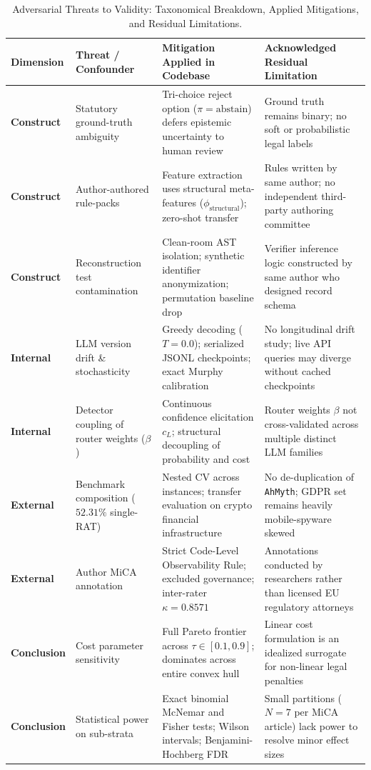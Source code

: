 \begin{table}[t]
\centering
\small
\caption{Adversarial Threats to Validity: Taxonomical Breakdown, Applied Mitigations, and Residual Limitations.}
\label{tab:threats_summary}
\begin{tabular}{p{2.2cm}p{3.8cm}p{5.0cm}p{4.8cm}}
\toprule
\textbf{Dimension} & \textbf{Threat / Confounder} & \textbf{Mitigation Applied in Codebase} & \textbf{Acknowledged Residual Limitation} \\
\midrule
\textbf{Construct} & Statutory ground-truth ambiguity & Tri-choice reject option ($\pi = \text{abstain}$) defers epistemic uncertainty to human review & Ground truth remains binary; no soft or probabilistic legal labels \\
\addlinespace
\textbf{Construct} & Author-authored rule-packs & Feature extraction uses structural meta-features ($\phi_{\text{structural}}$); zero-shot transfer & Rules written by same author; no independent third-party authoring committee \\
\addlinespace
\textbf{Construct} & Reconstruction test contamination & Clean-room AST isolation; synthetic identifier anonymization; permutation baseline drop & Verifier inference logic constructed by same author who designed record schema \\
\addlinespace
\textbf{Internal} & LLM version drift \& stochasticity & Greedy decoding ($T=0.0$); serialized JSONL checkpoints; exact Murphy calibration & No longitudinal drift study; live API queries may diverge without cached checkpoints \\
\addlinespace
\textbf{Internal} & Detector coupling of router weights ($\beta$) & Continuous confidence elicitation $c_L$; structural decoupling of probability and cost & Router weights $\beta$ not cross-validated across multiple distinct LLM families \\
\addlinespace
\textbf{External} & Benchmark composition ($52.31\%$ single-RAT) & Nested CV across instances; transfer evaluation on crypto financial infrastructure & No de-duplication of \texttt{AhMyth}; GDPR set remains heavily mobile-spyware skewed \\
\addlinespace
\textbf{External} & Author MiCA annotation & Strict Code-Level Observability Rule; excluded governance; inter-rater $\kappa = 0.8571$ & Annotations conducted by researchers rather than licensed EU regulatory attorneys \\
\addlinespace
\textbf{Conclusion} & Cost parameter sensitivity & Full Pareto frontier across $\tau \in [0.1, 0.9]$; dominates across entire convex hull & Linear cost formulation is an idealized surrogate for non-linear legal penalties \\
\addlinespace
\textbf{Conclusion} & Statistical power on sub-strata & Exact binomial McNemar and Fisher tests; Wilson intervals; Benjamini-Hochberg FDR & Small partitions ($N=7$ per MiCA article) lack power to resolve minor effect sizes \\
\bottomrule
\end{tabular}
\end{table}
